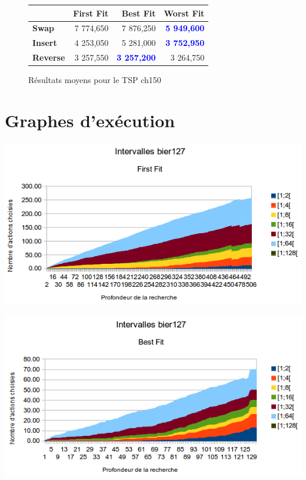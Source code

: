 \documentclass[a4paper,10pt]{report}
\begin{document}
\begin{figure}[h]
  \begin{center}
    \begin{tabular}{|l|r|r|r|}
      \hline
      &		\textbf{First Fit}&	\textbf{Best Fit}&	\textbf{Worst
Fit}\\\hline
      \textbf{Swap}&
	  7 774,650&
	  7 876,250&
	  \textbf{\textcolor{blue}{5 949,600}}\\\hline
      \textbf{Insert}&
	  4 253,050&
	  5 281,000&
	  \textbf{\textcolor{blue}{3 752,950}}\\\hline
      \textbf{Reverse}&
	  3 257,550&
	  \textbf{\textcolor{blue}{3 257,200}}&
	  3 264,750\\\hline
    \end{tabular}
    \caption{Résultats moyens pour le TSP ch150}
  \end{center}
\end{figure}

\section{Graphes d'exécution}

\begin{center}
  \includegraphics[width=\textwidth]{images/bier127-intervals-first-fit.png}
\end{center}

\begin{center}
  \includegraphics[width=\textwidth]{images/bier127-intervals-best-fit.png}
\end{center}
\end{document}
